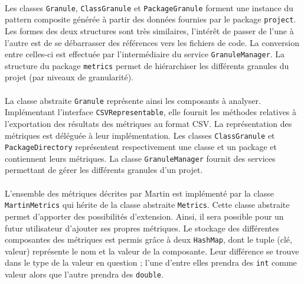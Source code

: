 \documentclass{scrartcl}
\begin{document}
    \paragraph{}Les classes \texttt{Granule}, \texttt{ClassGranule} et \texttt{PackageGranule} forment une instance du pattern composite générée à partir des données fournies par le package \texttt{project}. Les formes des deux structures sont très similaires, l'intérêt de passer de l'une à l'autre est de se débarrasser des références vers les fichiers de code. La conversion entre celles-ci est effectuée par l'intermédiaire du service \texttt{GranuleManager}. La structure du package \texttt{metrics} permet de hiérarchiser les différents granules du projet (par niveaux de granularité). 
    
    \paragraph{}La classe abstraite \texttt{Granule} représente ainsi les composants à analyser. Implémentant l'interface \texttt{CSVRepresentable}, elle fournit les méthodes relatives à l'exportation des résultats des métriques au format CSV. La représentation des métriques est déléguée à leur implémentation. Les classes \texttt{ClassGranule} et \texttt{PackageDirectory} représentent respectivement une classe et un package et contiennent leurs métriques. La classe \texttt{GranuleManager} fournit des services permettant de gérer les différents granules d'un projet.
    
    \paragraph{}L'ensemble des métriques décrites par Martin\cite{Martin:1994} est implémenté par la classe \texttt{MartinMetrics} qui hérite de la classe abstraite \texttt{Metrics}. Cette classe abstraite permet d'apporter des possibilités d'extension. Ainsi, il sera possible pour un futur utilisateur d'ajouter ses propres métriques. Le stockage des différentes composantes des métriques est permis grâce à deux \texttt{HashMap}, dont le tuple (clé, valeur) représente le nom et la valeur de la composante.
    Leur différence se trouve dans le type de la valeur en question ; l'une d'entre elles prendra des \texttt{int} comme valeur alors que l'autre prendra des \texttt{double}.
\end{document}

